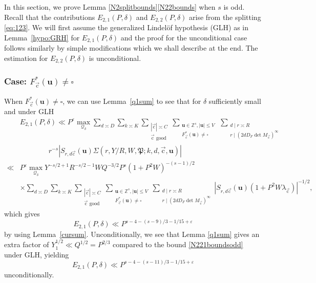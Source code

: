 \documentclass[letterpaper,11pt]{amsart}
\numberwithin{equation}{section}
\theoremstyle{definition}
\numberwithin{equation}{section}
\newcommand{\ZZ}{\mathbb{Z}}
\newcommand{\uu}{\mathbf{u}}
\newcommand{\uc}{{\vec{\mathrm{c}}}}
\newcommand{\ve}{\varepsilon}
\begin{document}
In this section, we prove Lemma \ref{N2splitbounds}\eqref{N22bounds} when $s$ is odd.
Recall that the contributions $E_{2,1}(P,\delta)$ and $E_{2,2}(P,\delta)$ arise from the splitting \eqref{eq:123}.
  We will first assume the generalized Lindel\"of hypothesis (GLH) as in Lemma~\ref{hypo:GRH} for $E_{2,1}(P, \delta)$ and the proof for the unconditional case follows similarly by simple modifications which we shall describe at the end. The estimation for $E_{2,2}(P, \delta)$ is unconditional.  
 
\subsubsection{Case: $F_\uc^*(\uu)\neq \square$}\label{sec:odd_s_nonsquare_Fstar_N211}
 When $F_\uc^*(\uu)\neq \square$, we can use Lemma~\ref{q1sum} to see that for $\delta$ sufficiently small and under GLH \begin{align*}
&E_{2,1}(P, \delta)\ll P^{\ve} \max_{ \mathcal Q_\delta}\sum_{d\asymp D}\sum_{k\asymp K}\sum_{\substack{|\uc|\asymp C\\ \uc \text{ good}}}\sum_{\substack{\uu\in\ZZ^s,  |\uu|\leq V\\ F_{\uc}^*(\uu)\not=\square }}\,\sum_{\substack{d\mid r\asymp R\\ r\mid (2dD_F\det M_\uc)^\infty}}\\ &\quad \quad \quad \quad r^{-s}|S_{r, d\uc}(\uu) \Sigma(r, Y/R, W, \mathfrak P;k,d, \uc, \uu)|\\
\ll& P^{\ve} \max_{\mathcal Q_\delta} Y^{-s/2+1}R^{-s/2-1}WQ^{-3/2} P^{s} (1+P^2W)^{-(s-1)/2}\\&\times \sum_{d\asymp D}\sum_{k\asymp K}\sum_{\substack{|\uc|\asymp C\\ \uc \text{ good}}}\sum_{\substack{\uu\in\ZZ^s,  |\uu|\leq V\\ F_{\uc}^*(\uu)\not=\square }}\sum_{\substack{d\mid r\asymp R\\  r\mid (2dD_F\det M_\uc)^\infty}}|S_{r, d\uc}(\uu)(1+P^2W\lambda_\uc)|^{-1/2},
\end{align*}
which gives
\begin{equation}\label{N221boundsodd}
    E_{2,1}(P, \delta)\ll P^{s-4-(s-9)/3-1/15+\ve}
\end{equation} by 
 using Lemma~\ref{cursum}.  Unconditionally, we see that Lemma \ref{q1sum} gives an extra factor of $Y_1^{1/2}\ll Q^{1/2}=P^{2/3}$ compared to the bound \eqref{N221boundsodd} under GLH, yielding \begin{equation}\label{N221boundsodduncond}
    E_{2,1}(P, \delta)\ll P^{s-4-(s-11)/3-1/15+\ve}
\end{equation} unconditionally.
\end{document}
